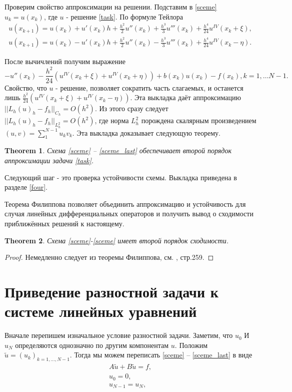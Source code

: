 \documentclass[12 pt, russian]{article}
\newtheorem{theo}{Theorem}[section]
\newcommand\beq{\begin{equation}}
\newcommand\eeq{\end{equation}}
\newcommand\bea{\begin{eqnarray}}
\newcommand\eea{\end{eqnarray}}
\begin{document}
Проверим свойство аппроксимации на решении. Подставим в \eqref{sceme} $u_k = u(x_k)$, где $u$ - решение \eqref{task}. По формуле Тейлора
\bea
u(x_{k+1}) = u(x_k) + u'(x_k) h + \frac{h^2}{2} u''(x_k) + \frac{h^3}{3} u'''(x_k) + \frac{h^4}{24} u^{IV}(x_k + \xi), \\
u(x_{k+1}) = u(x_k) -  u'(x_k) h + \frac{h^2}{2} u''(x_k) - \frac{h^3}{3} u'''(x_k) + \frac{h^4}{24} u^{IV}(x_k - \eta).
\eea

После вычичлений получим выражение
\beq
-u''(x_k) - \frac{h^2}{24} ( u^{IV}(x_k + \xi) + u^{IV}(x_k + \eta) ) + b(x_k) u(x_k) - f(x_k),  k = 1, \dots N -1 .
\eeq
Свойство, что $u$ - решение, позволяет сократить часть слагаемых, и останется лишь $\frac{h^2}{24} ( u^{IV}(x_k + \xi) + u^{IV}(x_k - \eta) )$. Эта выкладка даёт аппроксимацию $||L_h(u)_h - f_h ||_{C_h} = O(h^2)$. Из этого сразу следует  $||L_h(u)_h - f_h ||_{L^2_h} = O(h^2)$, где норма $L^2_h$ порождена скалярным произведением $(u, v) = \sum_1^{N-1} u_k v_k$. Эта выкладка доказывает следующую теорему.

\begin{theo}
Схема \eqref{sceme} -- \eqref{sceme_last} обеспечивает второй порядок аппроксимации задачи \eqref{task}.
\end{theo}

Следующий шаг - это проверка устойчивости схемы. Выкладка приведена в разделе \ref{four}.

Теорема Филиппова позволяет объединить аппроксимацию и устойчивость для случая линейных дифференциальных операторов и получить вывод о сходимости приближённых решений к настоящему.
\begin{theo}
Схема \eqref{sceme}-\eqref{sceme} имеет второй порядок сходимости.
\end{theo}
\begin{proof}
Немедленно следует из теоремы Филиппова, см. \cite{Kornev1}, стр.259.
\end{proof}

\section{Приведение разностной задачи к системе линейных уравнений}

Вначале перепишем изначальное условие разностной задачи. Заметим, что $u_0$ И $u_N$ определяются однозначно по другим компонентам $u$. Положим $\tilde u = (u_k)_{k = 1, \dots, N-1}$. Тогда мы можем переписать \eqref{sceme} -- \eqref{sceme_last} в виде
\bea
A \tilde u + B\tilde u = f,\\
u_0 = 0, \\
u_{N-1} = u_N, 
\eea
\end{document}

